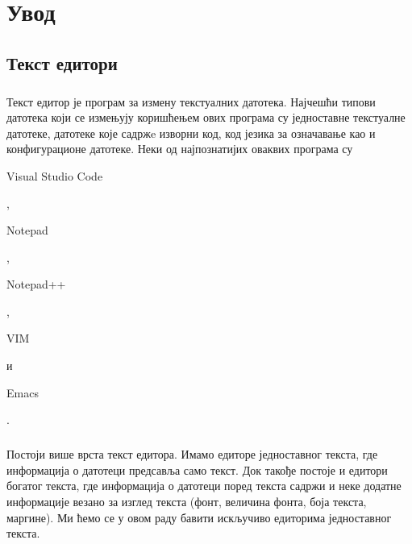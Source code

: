 \documentclass[12pt,oneside]{memoir}
\begin{document}
\frontmatter
\naslovna
\komisija
\apstrakt
\tableofcontents*

\mainmatter

\chapter{Увод}
\pangrami

\section{Текст едитори}

\paragraph{}
Текст едитор је програм за измену текстуалних датотека. Најчешћи типови датотека
који се измењују коришћењем ових програма су једноставне текстуалне датотеке, 
датотеке које садржe изворни код, код језика за означавање као и конфигурационе датотеке. 
Неки од најпознатијих оваквих програма су \begin{latinica}Visual Studio Code\end{latinica} \cite{VSC}, 
\begin{latinica}Notepad\end{latinica} \cite{Notepad}, \begin{latinica}Notepad++\end{latinica} 
\cite{Notepad++}, \begin{latinica}VIM\end{latinica} \cite{VIM} и \begin{latinica}Emacs\end{latinica} \cite{Emacs}.

\paragraph{}
Постоји више врста текст едитора. Имамо едиторе једноставног текста, где информација
о датотеци предсавља само текст. Док такође постоје и едитори богатог текста, где
информација о датотеци поред текста садржи и неке додатне информације везано за изглед
текста (фонт, величина фонта, боја текста, маргине). Ми ћемо се у овом раду бавити искључиво
едиторима једноставног текста.
\end{document}
